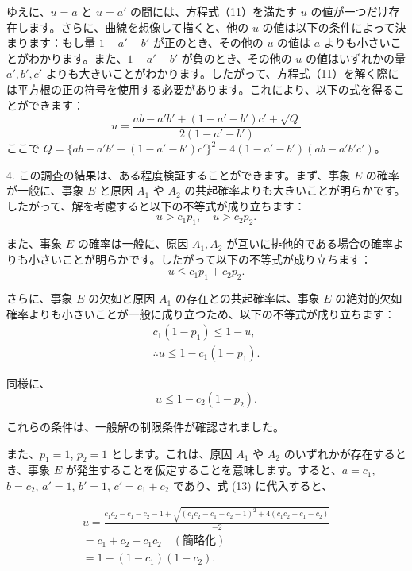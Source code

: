 \documentclass[a4paper,11pt,openany]{ltjsbook}
\begin{document}
ゆえに、$u = a$ と $u = a'$ の間には、方程式（11）を満たす $u$ の値が一つだけ存在します。さらに、曲線を想像して描くと、他の $u$ の値は以下の条件によって決まります：もし量 $1 - a' - b'$ が正のとき、その他の $u$ の値は $a$ よりも小さいことがわかります。また、$1 - a' - b'$ が負のとき、その他の $u$ の値はいずれかの量 $a', b', c'$ よりも大きいことがわかります。したがって、方程式（11）を解く際には平方根の正の符号を使用する必要があります。これにより、以下の式を得ることができます：
\begin{equation*}\tag{13}
u = \frac{ab - a'b' + (1 - a' - b')c' + \sqrt{Q}}{2(1 - a' - b')}
\end{equation*}
ここで $Q = \{ab - a'b' + (1 - a' - b')c'\}^2 - 4(1 - a' - b')(ab - a'b'c')$。

4. この調査の結果は、ある程度検証することができます。まず、事象 $E$ の確率が一般に、事象 $E$ と原因 $A_1$ や $A_2$ の共起確率よりも大きいことが明らかです。したがって、解を考慮すると以下の不等式が成り立ちます：
\begin{equation*}
u > c_1 p_1, \quad u > c_2 p_2.
\end{equation*}

また、事象 $E$ の確率は一般に、原因 $A_1, A_2$ が互いに排他的である場合の確率よりも小さいことが明らかです。したがって以下の不等式が成り立ちます：
\begin{equation*}
u \leq c_1 p_1 + c_2 p_2.
\end{equation*}

さらに、事象 $E$ の欠如と原因 $A_1$ の存在との共起確率は、事象 $E$ の絶対的欠如確率よりも小さいことが一般に成り立つため、以下の不等式が成り立ちます：
\begin{gather*}
c_1(1 - p_1) \leq 1 - u, \\
\therefore u \leq 1 - c_1(1 - p_1).
\end{gather*}

同様に、
\begin{equation*}
u \leq 1 - c_2(1 - p_2).
\end{equation*}

これらの条件は、一般解の制限条件が確認されました。

また、$p_1 = 1$, $p_2 = 1$ とします。これは、原因 $A_1$ や $A_2$ のいずれかが存在するとき、事象 $E$ が発生することを仮定することを意味します。すると、$a = c_1$, $b = c_2$, $a' = 1$, $b' = 1$, $c' = c_1 + c_2$ であり、式 (13) に代入すると、

\begin{gather*}
u = \frac{c_1 c_2 - c_1 - c_2 - 1
         + \sqrt{(c_1 c_2 - c_1 - c_2 - 1)^2
                 + 4(c_1 c_2 - c_1 - c_2)} }{-2} \\
= c_1 + c_2 - c_1 c_2 \quad (\text{簡略化})\\
= 1 - (1 - c_1)(1 - c_2).
\end{gather*}
\end{document}
